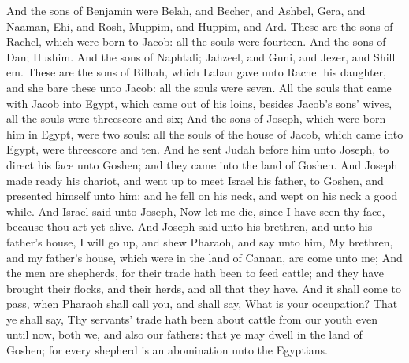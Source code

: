\begin{biblechapter}
\verse And the sons of Benjamin were Belah, and Becher, and Ashbel, Gera, and Naaman, Ehi, and Rosh, Muppim, and Huppim, and Ard.
\verse These are the sons of Rachel, which were born to Jacob: all the souls were fourteen.
\verse And the sons of Dan; Hushim.
\verse And the sons of Naphtali; Jahzeel, and Guni, and Jezer, and Shill em.
\verse These are the sons of Bilhah, which Laban gave unto Rachel his daughter, and she bare these unto Jacob: all the souls were seven.
\verse All the souls that came with Jacob into Egypt, which came out of his loins, besides Jacob's sons' wives, all the souls were threescore and six;
\verse And the sons of Joseph, which were born him in Egypt, were two souls: all the souls of the house of Jacob, which came into Egypt, were threescore and ten.
\verse And he sent Judah before him unto Joseph, to direct his face unto Goshen; and they came into the land of Goshen.
\verse And Joseph made ready his chariot, and went up to meet Israel his father, to Goshen, and presented himself unto him; and he fell on his neck, and wept on his neck a good while.
\verse And Israel said unto Joseph, Now let me die, since I have seen thy face, because thou art yet alive.
\verse And Joseph said unto his brethren, and unto his father's house, I will go up, and shew Pharaoh, and say unto him, My brethren, and my father's house, which were in the land of Canaan, are come unto me;
\verse And the men are shepherds, for their trade hath been to feed cattle; and they have brought their flocks, and their herds, and all that they have.
\verse And it shall come to pass, when Pharaoh shall call you, and shall say, What is your occupation?
\verse That ye shall say, Thy servants' trade hath been about cattle from our youth even until now, both we, and also our fathers: that ye may dwell in the land of Goshen; for every shepherd is an abomination unto the Egyptians.
\end{biblechapter}

